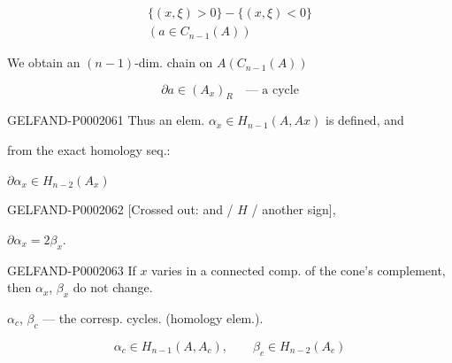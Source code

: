 \begin{gather*}\{(x,\xi)>0\}-\{(x,\xi)<0\}\\(a\in C_{n-1}(A))\end{gather*}



We obtain an $(n-1)$-dim. chain on $A$\quad$(C_{n-1}(A))$



\begin{equation*}\partial a\in (A_x)_R\quad\text{--- a cycle}\end{equation*}



\begin{GelfandAdjacentEvidence}{GELFAND-P000206}{1}
Thus an elem. $\alpha_x\in H_{n-1}(A, Ax)$ is defined, and
\end{GelfandAdjacentEvidence}

from the exact homology seq.:



$\partial\alpha_x\in H_{n-2}(A_x)$



\begin{GelfandAdjacentEvidence}{GELFAND-P000206}{2}
[Crossed out: and / $H$ / another sign],
\end{GelfandAdjacentEvidence}

$\partial\alpha_x=2\beta_x$.



\begin{GelfandAdjacentEvidence}{GELFAND-P000206}{3}
If $x$ varies in a connected comp. of the cone's complement, then $\alpha_x$, $\beta_x$ do not change.



\end{GelfandAdjacentEvidence}

$\alpha_c$, $\beta_c$ --- the corresp. cycles. (homology elem.).



\begin{equation*}\alpha_c\in H_{n-1}(A, A_c),\qquad\beta_c\in H_{n-2}(A_c)\end{equation*}



